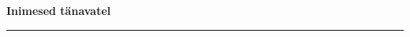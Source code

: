 \documentclass[10pt]{book}
\begin{document}
\pagebreak[3]

{
  \samepage
  \raggedbottom
  \raggedright
  \sloppy


  \vspace{0.2in}

  \noindent\begin{minipage}{.1\textwidth}
    \hfill\vspace{0.1in}
  \end{minipage}%
  \noindent\begin{minipage}{.8\textwidth}
    \centering
    \bfseries
    \large Inimesed t\"anavatel
  \end{minipage}%
  \noindent\begin{minipage}{.1\textwidth}
      \hfill\vspace{0.1in}
  \end{minipage}

  \nopagebreak[4]
  \vspace{0.1in}
  \nopagebreak[4]
  \hrule height 0.05ex
  \nopagebreak[4]
  \vspace{-0.05in}




}
\end{document}
